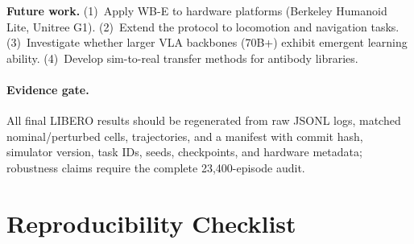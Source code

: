 ﻿\documentclass{article}
\begin{document}
\textbf{Future work.}
(1)~Apply WB-E to hardware platforms (Berkeley Humanoid Lite, Unitree G1).
(2)~Extend the protocol to locomotion and navigation tasks.
(3)~Investigate whether larger VLA backbones (70B+) exhibit emergent learning ability.
(4)~Develop sim-to-real transfer methods for antibody libraries.

\paragraph{Evidence gate.}
All final LIBERO results should be regenerated from raw JSONL logs, matched nominal/perturbed cells, trajectories, and a manifest with commit hash, simulator version, task IDs, seeds, checkpoints, and hardware metadata; robustness claims require the complete 23{,}400-episode audit.





\appendix

\section{Reproducibility Checklist}
\label{app:checklist}
\end{document}
